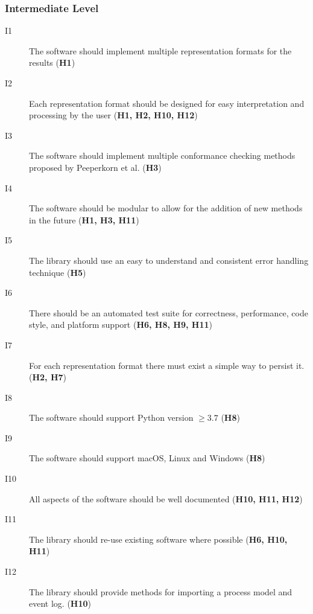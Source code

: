 \documentclass{article}
\begin{document}
\subsubsection{Intermediate Level}
\begin{description}
\item [I1] The software should implement multiple representation formats for the results (\textbf{H1})
\item [I2] Each representation format should be designed for easy interpretation and processing by the user (\textbf{H1, H2, H10, H12})
\item [I3] The software should implement multiple conformance checking methods proposed by Peeperkorn et al.\cite{inbook} (\textbf{H3})
\item [I4] The software should be modular to allow for the addition of new methods in the future (\textbf{H1, H3, H11})
\item [I5] The library should use an easy to understand and consistent error handling technique (\textbf{H5})
\item [I6] There should be an automated test suite for correctness, performance, code style, and platform support (\textbf{H6, H8, H9, H11})
\item [I7] For each representation format there must exist a simple way to persist it. (\textbf{H2, H7})
\item [I8] The software should support Python version $\geq 3.7$ (\textbf{H8})
\item [I9] The software should support \mbox{macOS}, Linux and Windows (\textbf{H8})
\item [I10] All aspects of the software should be well documented (\textbf{H10, H11, H12})
\item [I11] The library should re-use existing software where possible (\textbf{H6, H10, H11})
\item [I12] The library should provide methods for importing a process model and event log. (\textbf{H10})
\end{description}
\end{document}
